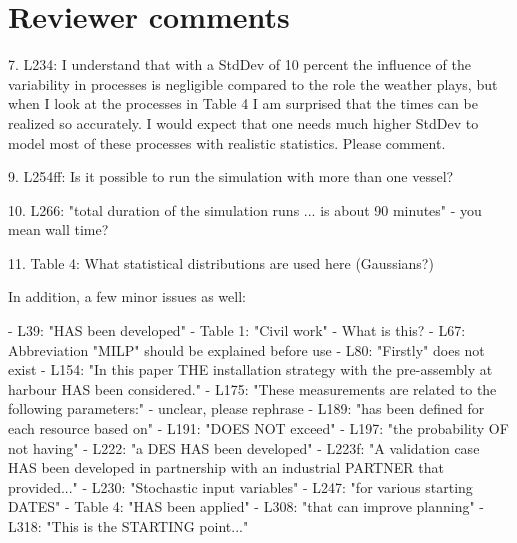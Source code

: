 \section{Reviewer comments}

7. L234: I understand that with a StdDev of 10 percent the influence of the variability in processes is negligible compared to the role the weather plays, but when I look at the processes in Table 4 I am surprised that the times can be realized so accurately. I would expect that one needs much higher StdDev to model most of these processes with realistic statistics. Please comment.

9. L254ff: Is it possible to run the simulation with more than one vessel?

10. L266: "total duration of the simulation runs ... is about 90 minutes" - you mean wall time?

11. Table 4: What statistical distributions are used here (Gaussians?)

In addition, a few minor issues as well:

- L39: "HAS been developed"
- Table 1: "Civil work" - What is this?
- L67: Abbreviation "MILP" should be explained before use
- L80: "Firstly" does not exist
- L154: "In this paper THE installation strategy with the pre-assembly at harbour HAS been considered."
- L175: "These measurements are related to the following parameters:" - unclear, please rephrase
- L189: "has been defined for each resource based on"
- L191: "DOES NOT exceed"
- L197: "the probability OF not having"
- L222: "a DES HAS been developed"
- L223f: "A validation case HAS been developed in partnership with an industrial PARTNER that provided..."
- L230: "Stochastic input variables"
- L247: "for various starting DATES"
- Table 4: "HAS been applied"
- L308: "that can improve planning"
- L318: "This is the STARTING point..."
